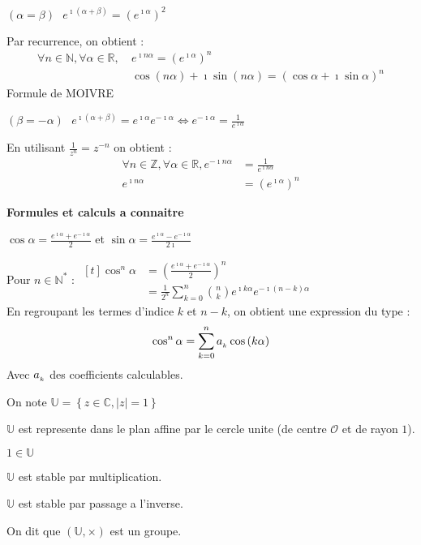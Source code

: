 \documentclass[12pt,twoside,a4paper]{article}
\begin{document}
		\begin{coro}
			\begin{liste}
				\item $\left(\alpha=\beta\right) \ \ \ e^{\imath\left(\alpha+\beta\right)}=\left(e^{\imath\alpha}\right)^2$
				\item Par recurrence, on obtient :
					$$\begin{aligned}
						\forall n\in\mathbb{N},\forall\alpha\in\mathbb{R}, \ &e^{\imath n\alpha}=\left(e^{\imath\alpha}\right)^n \\
									 &\cos\left(n\alpha\right)+\imath\sin\left(n\alpha\right)=\left(\cos\alpha+\imath\sin\alpha\right)^n
					\end{aligned}$$
					Formule de MOIVRE
				\item $\left(\beta=-\alpha\right) \ \ \ e^{\imath\left(\alpha+\beta\right)}=e^{\imath\alpha}e^{-\imath\alpha}\iff e^{-\imath\alpha}=\frac{1}{e^{\imath\alpha}}$
				\item En utilisant $\frac{1}{z^n}=z^{-n}$ on obtient :
					$$\begin{aligned}
						\forall n\in\mathbb{Z},\forall\alpha\in\mathbb{R},e^{-\imath n\alpha}&=\frac{1}{e^{\imath n\alpha}} \\
																					 e^{\imath n\alpha}&=\left(e^{\imath\alpha}\right)^n
					\end{aligned}$$
			\end{liste}
		\end{coro}
		\textbf{Formules et calculs a connaitre} \\
		\begin{liste}
			\item $\cos\alpha=\frac{e^{\imath\alpha}+e^{-\imath\alpha}}{2}$ et $\sin\alpha=\frac{e^{\imath\alpha}-e^{-\imath\alpha}}{2\imath}$
			\item Pour $n\in\mathbb{N}^*$ : $\begin{aligned}[t]\cos^n\alpha&=\left(\frac{e^{\imath\alpha}+e^{-\imath\alpha}}{2}\right)^n \\
																					&=\frac{1}{2^n}\sum\limits_{k=0}^n{n\choose{k}}e^{\imath k\alpha}e^{-\imath\left(n-k\right)\alpha}\end{aligned}$ \\
				En regroupant les termes d'indice $k$ et $n-k$, on obtient une expression du type :
				$$\cos^n\alpha=\sum\limits_{k=0}^na_{_{k}}\cos\left(k\alpha\right)$$
				Avec $a_{_{k}}$ des coefficients calculables.
		\end{liste}\newpage
		\begin{defi}
			On note $\mathbb{U}=\left\{z\in\mathbb{C},\left|z\right|=1\right\}$
			\begin{liste}
				\item $\mathbb{U}$ est represente dans le plan affine par le cercle unite (de centre $\mathcal{O}$ et de rayon $1$).
				\item $1\in\mathbb{U}$
				\item $\mathbb{U}$ est stable par multiplication.
				\item $\mathbb{U}$ est stable par passage a l'inverse.
			\end{liste}
			On dit que $\left(\mathbb{U},\times\right)$ est un groupe.
		\end{defi}
\end{document}
